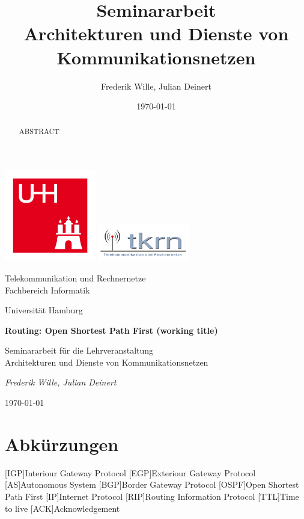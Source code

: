 \documentclass[1pt,a4paper,final]{article}
\title{\LARGE \bf
Seminararbeit\\ Architekturen und Dienste von Kommunikationsnetzen
}
\author{Frederik Wille, Julian Deinert}
\date{\today}
\begin{document}

\begin{titlepage}
	\centering
	\includegraphics[width=0.3\textwidth]{images/uhh_logo.jpg}\hspace{1cm}
	\includegraphics[width=0.3\textwidth]{images/tkrn_logo.jpg}\par
	{\Large Telekommunikation und Rechnernetze \\}
	{\large Fachbereich Informatik\\}
	{\large Universität Hamburg \par}
	\vspace{1.5cm}
	{\huge\bfseries Routing: Open Shortest Path First (working title)\par}
	\vspace{1.5cm}
	{\large Seminararbeit für die Lehrveranstaltung \\ \Large Architekturen und Dienste von Kommunikationsnetzen\par}

	\vfill
	\vfill
	{\Large\itshape Frederik Wille, Julian Deinert\par}

	\vfill

	{\large \today\par}
\end{titlepage}
\thispagestyle{empty}
\newpage
\thispagestyle{empty}
\tableofcontents
\newpage
\setcounter{page}{1}

\section*{Abkürzungen}
\begin{acronym}
		[IGP]{Interiour Gateway Protocol}
		[EGP]{Exteriour Gateway Protocol}
		[AS]{Autonomous System}
		[BGP]{Border Gateway Protocol}
		{Open Shortest Path First}
		[IP]{Internet Protocol}
		[RIP]{Routing Information Protocol}
		[TTL]{Time to live}
		[ACK]{Acknowledgement}
\end{acronym}
\newpage
\begin{abstract}
ABSTRACT

\end{abstract}
\end{document}

